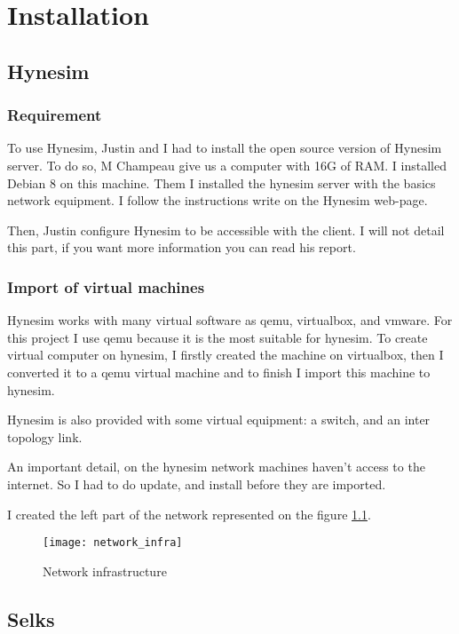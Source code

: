 
\chapter{Installation}

\section{Hynesim}

\subsection{Requirement}

To use Hynesim, Justin and I had to install the open source version of Hynesim server. To do so, M Champeau give us
a computer with 16G of RAM. I installed Debian 8 on this machine. Them I installed the hynesim server with the
basics network equipment. I follow the instructions write on the Hynesim web-page.

Then, Justin configure Hynesim to be accessible with the client. I will not detail this part, if you want more
information you can read his report.


\subsection{Import of virtual machines}

Hynesim works with many virtual software as qemu, virtualbox, and vmware. For this project I use qemu because it is
the most suitable for hynesim. To create virtual computer on hynesim, I firstly created the machine on virtualbox,
then I converted it to a qemu virtual machine and to finish I import this machine to hynesim.

Hynesim is also provided with some virtual equipment: a switch, and an inter topology link.

An important detail, on the hynesim network machines haven't access to the internet. So I had to do update, and
install before they are imported.

I created the left part of the network represented on the figure \ref{fig:network}.


\begin{figure}[h]
  \centering
  \texttt{[image: network\_infra]}
  \caption{Network infrastructure}
  \label{fig:network}
\end{figure}

\section{Selks}

